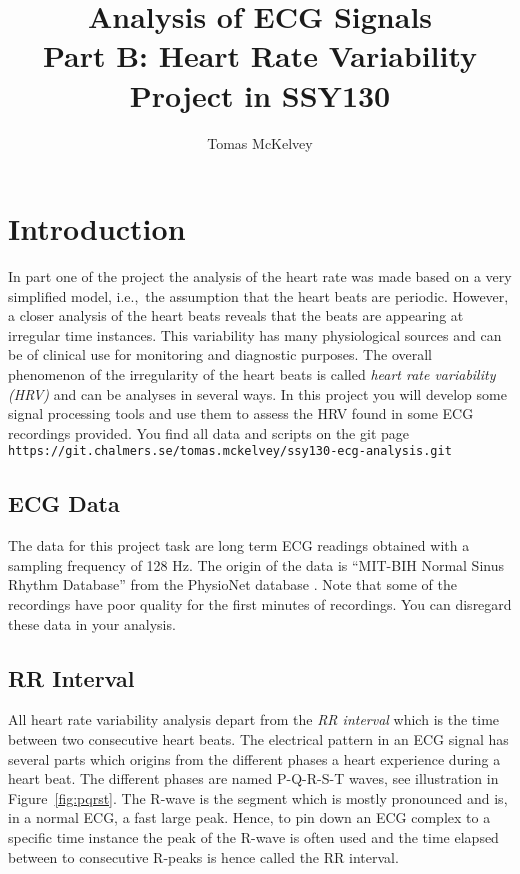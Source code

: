 \documentclass[12pt]{article}
\begin{document}
\title{Analysis of ECG Signals \\ Part B: Heart Rate Variability \\ Project in SSY130 }
\author{Tomas McKelvey}

\maketitle{}
\section{Introduction}
In part one of the project the analysis of the heart rate was made
based on a very simplified model, i.e.,\ the assumption that the heart
beats are periodic. However, a closer analysis of the heart beats
reveals that the beats are appearing at irregular time instances. This
variability has many physiological sources and can be of clinical use
for monitoring and diagnostic  purposes. The overall phenomenon of the
irregularity of the heart beats is called \emph{heart rate variability
  (HRV)} and can be analyses in several ways. In this project you will
develop some signal processing tools and use them to assess the
HRV found in some ECG recordings provided. You find all data and
scripts on the git page \texttt{https://git.chalmers.se/tomas.mckelvey/ssy130-ecg-analysis.git}

\subsection{ECG Data}
\label{sec:ecg-data}

The data for this project task are long term ECG readings obtained
with a sampling frequency of 128 Hz. The origin of the data is ``MIT-BIH Normal
Sinus Rhythm Database''  from the PhysioNet database
\cite{goldberger2000physiobank}.  Note that some of the recordings
have poor quality for the first minutes of recordings. You can
disregard these data in your analysis. 

\subsection{RR Interval}
\label{sec:r-r-interval}

All heart rate variability analysis depart from the \emph{RR
  interval} which is the time between two consecutive heart
beats. The electrical pattern in an ECG signal has several parts which
origins from the different phases a heart experience during a heart
beat. The different phases are named P-Q-R-S-T waves, see illustration
in Figure~\ref{fig:pqrst}. The R-wave is the segment which is mostly
pronounced and is, in a normal ECG, a fast large peak. Hence, to pin down an ECG
complex to a specific time instance the peak of the R-wave is often used and
the time elapsed between to consecutive R-peaks is hence called the RR
interval.
\end{document}
